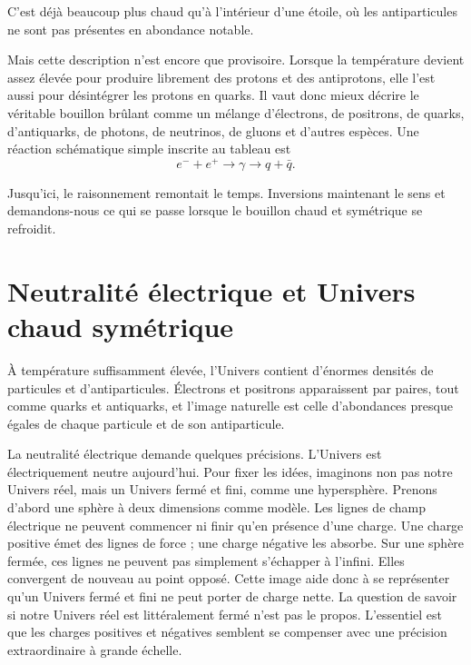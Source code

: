 C’est déjà beaucoup plus chaud qu’à l’intérieur d’une étoile, où les antiparticules ne sont pas présentes en abondance notable.

Mais cette description n’est encore que provisoire. Lorsque la température devient assez élevée pour produire librement des protons et des antiprotons, elle l’est aussi pour désintégrer les protons en quarks. Il vaut donc mieux décrire le véritable bouillon brûlant comme un mélange d’électrons, de positrons, de quarks, d’antiquarks, de photons, de neutrinos, de gluons et d’autres espèces. Une réaction schématique simple inscrite au tableau est
\[
e^- + e^+ \to \gamma \to q + \bar q.
\]

\begin{classroomqa}
\end{classroomqa}

Jusqu’ici, le raisonnement remontait le temps. Inversions maintenant le sens et demandons-nous ce qui se passe lorsque le bouillon chaud et symétrique se refroidit.

\section{Neutralité électrique et Univers chaud symétrique}

À température suffisamment élevée, l’Univers contient d’énormes densités de particules et d’antiparticules. Électrons et positrons apparaissent par paires, tout comme quarks et antiquarks, et l’image naturelle est celle d’abondances presque égales de chaque particule et de son antiparticule.

La neutralité électrique demande quelques précisions. L’Univers est électriquement neutre aujourd’hui. Pour fixer les idées, imaginons non pas notre Univers réel, mais un Univers fermé et fini, comme une hypersphère. Prenons d’abord une sphère à deux dimensions comme modèle. Les lignes de champ électrique ne peuvent commencer ni finir qu’en présence d’une charge. Une charge positive émet des lignes de force ; une charge négative les absorbe. Sur une sphère fermée, ces lignes ne peuvent pas simplement s’échapper à l’infini. Elles convergent de nouveau au point opposé. Cette image aide donc à se représenter qu’un Univers fermé et fini ne peut porter de charge nette. La question de savoir si notre Univers réel est littéralement fermé n’est pas le propos. L’essentiel est que les charges positives et négatives semblent se compenser avec une précision extraordinaire à grande échelle.

